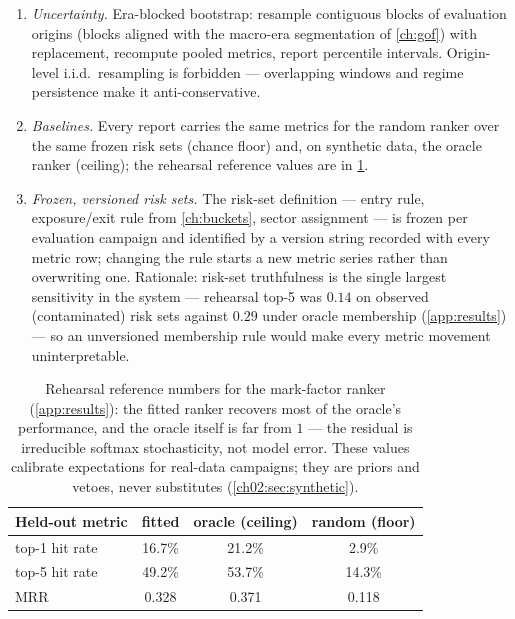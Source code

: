 \begin{protocol}
\begin{enumerate}[label=(\alph*)]
NLL of \cref{eq:ch10:nll} on the same events: the list metrics say
whether the sort is right, the NLL says whether the probabilities feeding
the decision layer are right, and \cref{lem:ch10:topk} is the license to
demand both from one model.
\item \emph{Uncertainty.} Era-blocked bootstrap: resample contiguous
blocks of evaluation origins (blocks aligned with the macro-era
segmentation of \cref{ch:gof}) with replacement, recompute pooled
metrics, report percentile intervals. Origin-level i.i.d.\ resampling is
forbidden --- overlapping windows and regime persistence make it
anti-conservative.
\item \emph{Baselines.} Every report carries the same metrics for the
random ranker over the same frozen risk sets (chance floor) and, on
synthetic data, the oracle ranker (ceiling); the rehearsal reference
values are in \cref{tab:ch10:rehearsal}.
\item \emph{Frozen, versioned risk sets.} The risk-set definition ---
entry rule, exposure/exit rule from \cref{ch:buckets}, sector assignment
--- is frozen per evaluation campaign and identified by a version string
recorded with every metric row; changing the rule starts a new metric
series rather than overwriting one. Rationale: risk-set truthfulness is
the single largest sensitivity in the system --- rehearsal top-5 was
$0.14$ on observed (contaminated) risk sets against $0.29$ under oracle
membership (\cref{app:results}) --- so an unversioned membership rule
would make every metric movement uninterpretable.
\end{enumerate}
\end{protocol}

\begin{table}[htbp]
\centering
\small
\begin{tabular}{lccc}
\toprule
\textbf{Held-out metric} & \textbf{fitted} & \textbf{oracle (ceiling)} &
\textbf{random (floor)} \\
\midrule
top-1 hit rate & 16.7\% & 21.2\% & 2.9\% \\
top-5 hit rate & 49.2\% & 53.7\% & 14.3\% \\
MRR            & 0.328  & 0.371  & 0.118 \\
\bottomrule
\end{tabular}
\caption{Rehearsal reference numbers for the mark-factor ranker
(\cref{app:results}): the fitted ranker recovers most of the oracle's
performance, and the oracle itself is far from $1$ --- the residual is
irreducible softmax stochasticity, not model error. These values
calibrate expectations for real-data campaigns; they are priors and
vetoes, never substitutes (\cref{ch02:sec:synthetic}).}
\label{tab:ch10:rehearsal}
\end{table}

